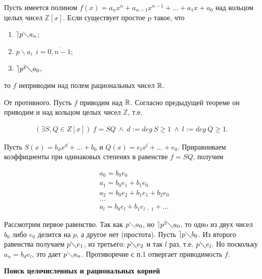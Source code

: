 \documentclass{article}
\begin{document}


Пусть имеется полином $f(x)=a_n x^n+a_{n-1} x^{n-1}+\ldots +a_1 x+a_0$ над кольцом целых чисел $\mathbb{Z} [x]$.
Если существует простое p такое, что

\begin{enumerate}
	\item{} $\rceil p\diagdown a_n$;
	\item{} $p\backslash a_i~~i=\overline{0, n-1}$;
	\item{} $\rceil p^2\diagdown a_0$,
\end{enumerate}

то $f$ неприводим над полем рациональных чисел $\mathbb{R}$.

\proof

От противного. Пусть $f$ приводим над $\mathbb{R}$. Согласно предыдущей
теореме он приводим и над кольцом целых чисел $\mathbb{Z}$, т.е.

\begin{align*}
	(\exists S,Q\in Z[x])~f=SQ~\land ~d:=deg~S\geq 1~\land ~l:=deg~Q\geq 1.
\end{align*}

Пусть $S(x)=b_d x^d +\ldots+b_0$ и $Q(x)=e_l x^l+\ldots +e_0$.
Приравниваем коэффициенты при одинаковых степенях в равенстве $f=SQ$, получим

\begin{align*}
	 & a_0=b_0 e_0                    \\
	 & a_1=b_0 e_1+b_1 e_0            \\
	 & a_2=b_0 e_2+b_1 e_1+b_2 e_0    \\
	 & \ldots                         \\
	 & a_l=b_0 e_l+b_1 e_{l-1}+\ldots
\end{align*}

Рассмотрим первое равенство. Так как $p\diagdown a_0$, но $\rceil p^2\diagdown a_0$, то однo из двух чисел $b_0$ либо $e_0$ делится на $p$, а другое нет (простота).
Пусть $\rceil p\diagdown b_0$. Из второго равенства получаем $p\diagdown e_1$, из третьего: $p\diagdown e_2$ и так $l$ раз, т.е. $p\diagdown e_l$.
Но поскольку $a_n=b_d e_l$, это дает $p\diagdown a_n$.  Противоречие с п.1 отвергает приводимость $f$.\newpage

\textbf{Поиск целочисленных и рациональных корней} \newline
\end{document}
